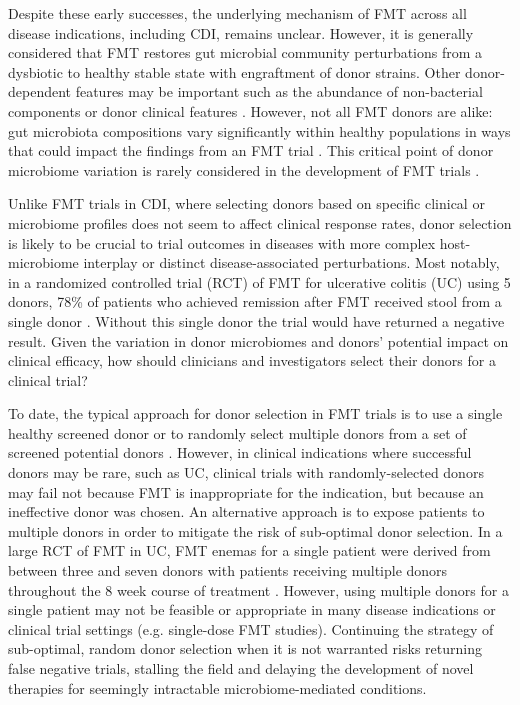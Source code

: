 Despite these early successes, the underlying mechanism of FMT across all disease indications, including CDI, remains unclear.
However, it is generally considered that FMT restores gut microbial community perturbations from a dysbiotic to healthy stable state with engraftment of donor strains.
Other donor-dependent features may be important such as the abundance of non-bacterial components or donor clinical features \cite{Ott2017,Zuo2018}.
However, not all FMT donors are alike: gut microbiota compositions vary significantly within healthy populations in ways that could impact the findings from an FMT trial \cite{Yatsunenko2012}.
This critical point of donor microbiome variation is rarely considered in the development of FMT trials \cite{Bafeta2017,Olesen2018}.

Unlike FMT trials in CDI, where selecting donors based on specific clinical or microbiome profiles does not seem to affect clinical response rates, donor selection is likely to be crucial to trial outcomes in diseases with more complex host-microbiome interplay or distinct disease-associated perturbations.
Most notably, in a randomized controlled trial (RCT) of FMT for ulcerative colitis (UC) using 5 donors, 78\% of patients who achieved remission after FMT received stool from a single donor \cite{Moayyedi2015}.
Without this single donor the trial would have returned a negative result.
Given the variation in donor microbiomes and donors' potential impact on clinical efficacy, how should clinicians and investigators select their donors for a clinical trial?

To date, the typical approach for donor selection in FMT trials is to use a single healthy screened donor or to randomly select multiple donors from a set of screened potential donors \cite{Paramsothy2017,Kelly2016,vanNood2013}.
However, in clinical indications where successful donors may be rare, such as UC, clinical trials with randomly-selected donors may fail not because FMT is inappropriate for the indication, but because an ineffective donor was chosen.
An alternative approach is to expose patients to multiple donors in order to mitigate the risk of sub-optimal donor selection.
In a large RCT of FMT in UC, FMT enemas for a single patient were derived from between three and seven donors with patients receiving multiple donors throughout the 8 week course of treatment \cite{Paramsothy2017}.
However, using multiple donors for a single patient may not be feasible or appropriate in many disease indications or clinical trial settings (e.g. single-dose FMT studies).
Continuing the strategy of sub-optimal, random donor selection when it is not warranted risks returning false negative trials, stalling the field and delaying the development of novel therapies for seemingly intractable microbiome-mediated conditions.

